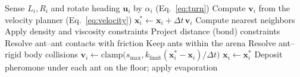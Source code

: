 \documentclass[9pt,twoside]{pnas-new}
\begin{document}
\begin{algorithm}[H]
\caption{Simulation loop. Lines marked $\star$ are our additions to the loop of Loges and Weiss \cite{loges2025}.}
\label{alg:loop}
\begin{algorithmic}[1]
         \Comment{$\star$}
            \State Sense $L_i, R_i$ and rotate heading $\mathbf{u}_i$ by $\alpha_i$ (Eq.~\ref{eq:turn}) \Comment{$\star$}
        \EndIf
        \State Compute $\mathbf{v}_i$ from the velocity planner (Eq.~\ref{eq:velocity})
        \State $\mathbf{x}^*_i \gets \mathbf{x}_i + \Delta t\,\mathbf{v}_i$
    \EndFor
    \State Compute nearest neighbors
        \State Apply density and viscosity constraints
        \State Project distance (bond) constraints
        \State Resolve ant--ant contacts with friction
        \State Keep ants within the arena
    \EndWhile
    \State Resolve ant--rigid body collisions
        \State $\mathbf{v}_i \gets \text{clamp}\big(s_{\max}, k_{\text{limit}}(\mathbf{x}^*_i - \mathbf{x}_i)/\Delta t\big)$
        \State $\mathbf{x}_i \gets \mathbf{x}^*_i$
    \EndFor
    \State Deposit pheromone under each ant on the floor; apply evaporation \Comment{$\star$}
\end{algorithmic}
\end{algorithm}
\end{document}
